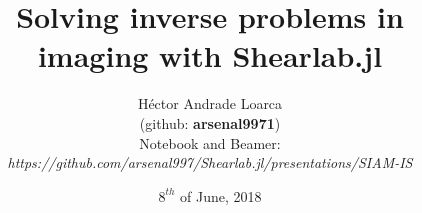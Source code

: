 \title[Solving inverse problems in imaging with Shearlab.jl]{Solving inverse problems in imaging with Shearlab.jl}
\author{H\'ector Andrade Loarca\\ (github: \textbf{arsenal9971})\\Notebook and Beamer:\\\textit{https://github.com/arsenal997/Shearlab.jl/presentations/SIAM-IS}}
\date{$8^{th}$ of June, 2018}


\newcommand{\mylogo}{\texttt{[image: ./Images/AFG.pdf]}}

\begin{frame}[plain]
        \titlepage
\end{frame}

